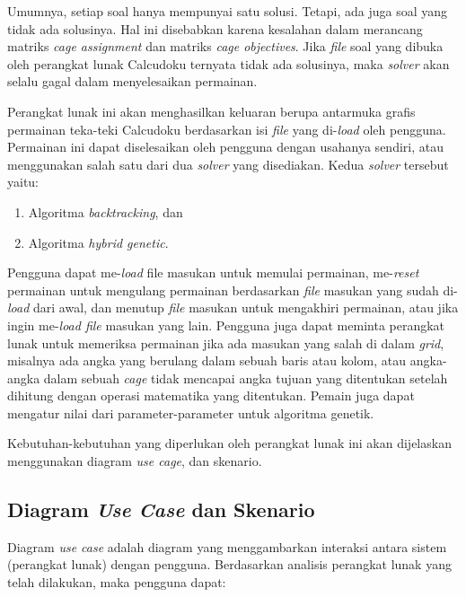 Umumnya, setiap soal hanya mempunyai satu solusi. Tetapi, ada juga soal yang tidak ada solusinya. Hal ini disebabkan karena kesalahan dalam merancang matriks \textit{cage assignment} dan matriks \textit{cage objectives}. Jika \textit{file} soal yang dibuka oleh perangkat lunak Calcudoku ternyata tidak ada solusinya, maka \textit{solver} akan selalu gagal dalam menyelesaikan permainan.

Perangkat lunak ini akan menghasilkan keluaran berupa antarmuka grafis permainan teka-teki Calcudoku berdasarkan isi \textit{file} yang di-\textit{load} oleh pengguna. Permainan ini dapat diselesaikan oleh pengguna dengan usahanya sendiri, atau menggunakan salah satu dari dua \textit{solver} yang disediakan. Kedua \textit{solver} tersebut yaitu:

\begin{enumerate}
\item Algoritma \textit{backtracking}, dan
\item Algoritma \textit{hybrid genetic}.
\end{enumerate}

Pengguna dapat me-\textit{load} file masukan untuk memulai permainan, me-\textit{reset} permainan untuk mengulang permainan berdasarkan \textit{file} masukan yang sudah di-\textit{load} dari awal, dan menutup \textit{file} masukan untuk mengakhiri permainan, atau jika ingin me-\textit{load file} masukan yang lain. Pengguna juga dapat meminta perangkat lunak untuk memeriksa permainan jika ada masukan yang salah di dalam \textit{grid}, misalnya ada angka yang berulang dalam sebuah baris atau kolom, atau angka-angka dalam sebuah \textit{cage} tidak mencapai angka tujuan yang ditentukan setelah dihitung dengan operasi matematika yang ditentukan. Pemain juga dapat mengatur nilai dari parameter-parameter untuk algoritma genetik.

Kebutuhan-kebutuhan yang diperlukan oleh perangkat lunak ini akan dijelaskan menggunakan diagram \textit{use cage}, dan skenario.

\subsection{Diagram \textit{Use Case} dan Skenario}
\label{sec:analisisusecase}

Diagram \textit{use case} adalah diagram yang menggambarkan interaksi antara sistem (perangkat lunak) dengan pengguna. Berdasarkan analisis perangkat lunak yang telah dilakukan, maka pengguna dapat:

